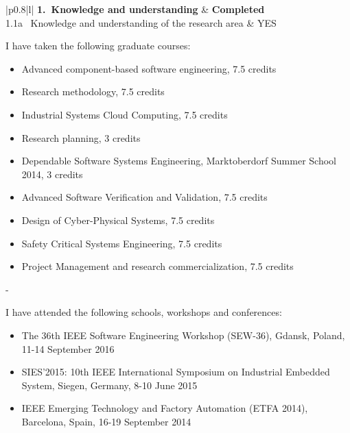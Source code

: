 \begin{longtable}{|p{0.8\linewidth}|l|}
\hline \textbf{1.~Knowledge and understanding} & \textbf{Completed }\\
\hline
\hline 1.1a~ Knowledge and understanding of the research area & YES\\
\hline {}
  \begin{minipage}{\linewidth}\vspace{0.2cm}
  I have taken the following graduate courses:\vspace{-0.2cm}
  \begin{itemize}\itemsep-0.25em
    \item Advanced component-based software  engineering, 7.5 credits
    \item Research methodology, 7.5 credits
    \item Industrial Systems Cloud Computing, 7.5 credits
    \item Research planning, 3 credits
    \item Dependable Software Systems Engineering, Marktoberdorf Summer School 2014, 3 credits
    \item Advanced Software Verification and Validation, 7.5 credits
    \item Design of Cyber-Physical Systems, 7.5 credits
    \item Safety Critical Systems Engineering, 7.5 credits
    \item Project Management and research commercialization, 7.5 credits
  \end{itemize}
  \end{minipage}\hfill\vline\kern-\arrayrulewidth\\[2cm]
  \begin{minipage}{\linewidth}  \vspace{0.2cm}
 I have attended the following schools, workshops and conferences:\vspace{-0.2cm}
  \begin{itemize}
 \itemsep-0.25em
    \item The 36th IEEE Software Engineering Workshop (SEW-36), Gdansk, Poland, 11-14 September 2016
    \item SIES'2015: 10th IEEE International Symposium on Industrial Embedded System, Siegen, Germany, 8-10 June 2015
    \item IEEE Emerging Technology and Factory Automation (ETFA 2014), Barcelona, Spain, 16-19 September 2014

\end{itemize}
\end{minipage}
\end{longtable}
